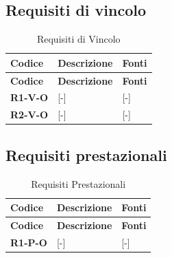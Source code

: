 \subsection{Requisiti di vincolo}
\begin{longtable}{|p{2.5cm}|p{8.5cm}|p{3.5cm}|}
	\caption{Requisiti di Vincolo} \\
	\hline
	\rowcolor{primarycolor!10}
	\textbf{Codice} & \textbf{Descrizione} & \textbf{Fonti} \\
	\hline
	\endfirsthead
	
	\hline
	\rowcolor{primarycolor!10}
	\textbf{Codice} & \textbf{Descrizione} & \textbf{Fonti} \\
	\hline
	\endhead
	
	\textbf{R1-V-O} & [-] & [-] \\ \hline
	\textbf{R2-V-O} & [-] & [-] \\ \hline
\end{longtable}

\subsection{Requisiti prestazionali}
\begin{longtable}{|p{2.5cm}|p{8.5cm}|p{3.5cm}|}
	\caption{Requisiti Prestazionali} \\
	\hline
	\rowcolor{primarycolor!10}
	\textbf{Codice} & \textbf{Descrizione} & \textbf{Fonti} \\
	\hline
	\endfirsthead
	
	\hline
	\rowcolor{primarycolor!10}
	\textbf{Codice} & \textbf{Descrizione} & \textbf{Fonti} \\
	\hline
	\endhead
	
	\textbf{R1-P-O} & [-] & [-] \\ \hline
\end{longtable}